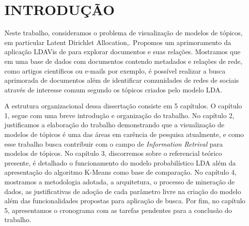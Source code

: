 \documentclass[12pt,a4paper]{article}
\begin{document}
\newpage
\pagestyle{plain}
\renewcommand{\baselinestretch}{1.5}
\normalsize
\section{INTRODUÇÃO}
 Neste trabalho, consideramos o problema de visualização de modelos de tópicos, em particular Latent Dirichlet Allocation,\cite{blei2003latent}.
 Propomos um aprimoramento da aplicação LDAVis de  para explorar documentos e suas relações. Mostramos que em uma base de dados
 com documentos contendo metadados e relações de rede, como artigos científicos ou e-mails por exemplo, é possível realizar a busca aprimorada de documentos além de identificar
 comunidades de redes de sociais através de interesse comum segundo os tópicos criados pelo modelo LDA.

 A estrutura organizacional dessa dissertação consiste em 5 capítulos. O capítulo 1, segue com uma breve introdução e organização do trabalho. 
  No capítulo 2, justificamos a elaboração do trabalho demonstrando que a visualização de modelos de tópicos é uma das áreas em carência de pesquisa atualmente, 
  e como esse trabalho busca contribuir com o campo de \textit{Information Retrival} para modelos de tópicos. No capítulo 3, discorremos sobre o referencial teórico presente, 
  é detalhado o funcionamento do modelo probabilístico LDA além da apresentação do algoritmo K-Means como base de comparação. No capítulo 4, mostramos a metodologia adotada, 
  a arquitetura, o processo de mineração de dados, as justificativas de adoção de cada parâmetro livre na criação do modelo além das funcionalidades propostas para
  aplicação de busca. Por fim, no capítulo 5, apresentamos o cronograma com as tarefas pendentes para a conclusão do trabalho.


\end{document}
